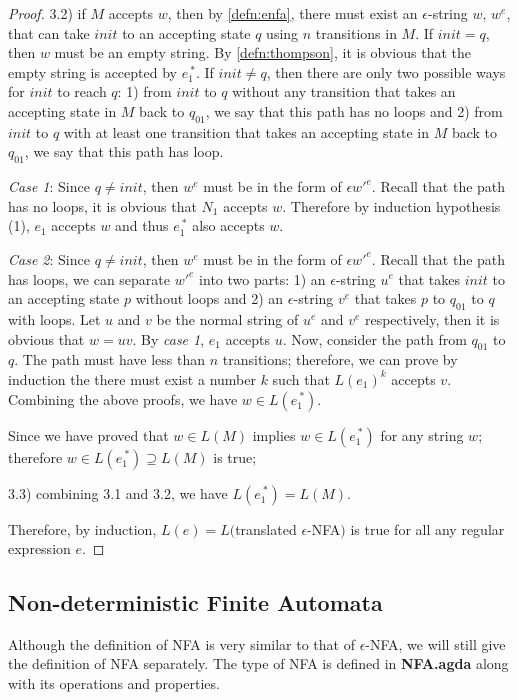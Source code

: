 \begin{proof}
\par 3.2) if \(M\) accepts \(w\), then by \autoref{defn:enfa}, there must exist an
\(\epsilon\)-string \(w\), \(w^e\), that can take \(init\) to an accepting
state \(q\) using \(n\) transitions in \(M\).  If \(init = q\), then \(w\) must be an empty
string. By \autoref{defn:thompson}, it is obvious that
the empty string is accepted by \(e_1^{\ *}\). If \(init \neq q\),
then there are only two possible ways for \(init\)
to reach \(q\): 1) from \(init\) to \(q\) without any
transition that takes an accepting state in \(M\) back
to \(q_{01}\), we say that this path has no loops and 2) from \(init\)
to \(q\) with at least one transition that takes an accepting state in \(M\) back
to \(q_{01}\), we say that this path has loop. 
\par \quad \textit{Case 1}: Since \(q \neq init\), then \(w^e\) must
be in the form of \(\epsilon w'^e\). Recall that the path has no loops, it is
obvious that \(N_1\) accepts \(w\). Therefore by
induction hypothesis (1), \(e_1\) accepts \(w\) and thus \(e_1^{\ *}\)
also accepts \(w\). 
\par \quad \textit{Case 2}: Since \(q \neq init\), then \(w^e\) must
be in the form of \(\epsilon w'^e\). Recall that the path has loops, we
can separate \(w'^e\) into two parts: 1) an \(\epsilon\)-string
\(u^e\) that takes \(init\) to an accepting state \(p\) without loops
and 2) an \(\epsilon\)-string \(v^e\) that takes \(p\) to
\(q_{01}\) to \(q\) with loops. Let \(u\) and \(v\) be the normal
string of \(u^e\) and \(v^e\) respectively, then it is obvious that
\(w = uv\). By \textit{case 1}, \(e_1\) accepts \(u\). Now, consider
the path from \(q_{01}\) to \(q\). The path must have less than \(n\)
transitions; therefore, we can prove by induction the there must exist a number \(k\) such that
\(L(e_1)^k\) accepts \(v\). Combining the above proofs, we have \(w \in
L(e_1^{\ *})\). 
\par \quad Since we have proved that \(w \in L(M)\) implies \(w \in L(e_1^{\
  *})\) for any string \(w\); therefore \(w \in L(e_1^{\ *}) \supseteq L(M)\) is true; 

\par 3.3) combining 3.1 and 3.2, we have \(L(e_1^{\ *}) = L(M)\). 

\par \noindent Therefore, by induction, \(L(e) = L(\)translated
\(\epsilon\)-NFA\()\) is true for all any regular expression \(e\). 
\end{proof}


\subsection{Non-deterministic Finite Automata}
\par Although the definition of NFA is very similar to that of
\(\epsilon\)-NFA, we will still give the definition of NFA
separately. The type of NFA is defined in \textbf{NFA.agda} along with
its operations and properties. 

